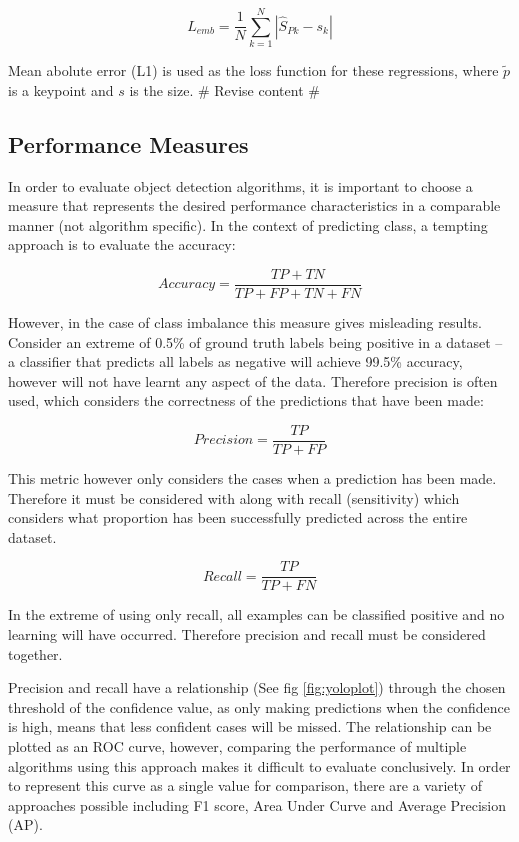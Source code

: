 \documentclass[a4paper,twoside,12pt]{report}
\begin{document}
\begin{equation}
L_{emb} =  \frac{1}{N} \sum_{k=1}^{N} |\hat{S}_{Pk}-s_k|
\end{equation}

Mean abolute error (L1) is used as the loss function for these regressions, where $\tilde{p}$ is a keypoint and $s$ is the size. \# Revise content \#

\subsection{Performance Measures}

In order to evaluate object detection algorithms, it is important to choose a measure that represents the desired performance characteristics in a comparable manner (not algorithm specific). In the context of predicting class, a tempting approach is to evaluate the accuracy:

\begin{equation}
Accuracy = \frac{TP + TN}{TP + FP + TN + FN}
\end{equation}

However, in the case of class imbalance this measure gives misleading results. Consider an extreme of 0.5\% of ground truth labels being positive in a dataset -- a classifier that predicts all labels as negative will achieve 99.5\% accuracy, however will not have learnt any aspect of the data. Therefore precision is often used, which considers the correctness of the predictions that have been made:

\begin{equation}
Precision = \frac{TP}{TP + FP}
\end{equation}

This metric however only considers the cases when a prediction has been made. Therefore it must be considered with along with recall (sensitivity) which considers what proportion has been successfully predicted across the entire dataset.

\begin{equation}
Recall = \frac{TP}{TP + FN}
\end{equation}

In the extreme of using only recall, all examples can be classified positive and no learning will have occurred. Therefore precision and recall must be considered together.

Precision and recall have a relationship (See fig \ref{fig:yoloplot}) through the chosen threshold of the confidence value, as only making predictions when the confidence is high, means that less confident cases will be missed. The relationship can be plotted as an ROC curve, however, comparing the performance of multiple algorithms using this approach makes it difficult to evaluate conclusively. In order to represent this curve as a single value for comparison, there are a variety of approaches possible including F1 score, Area Under Curve and Average Precision (AP).
\end{document}
